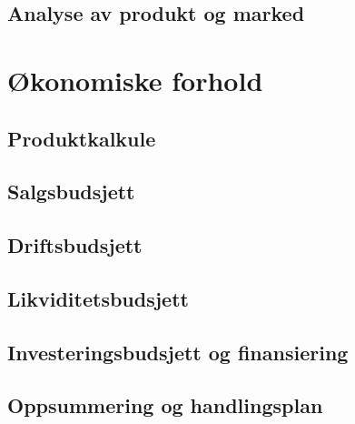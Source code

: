 \subsection{Analyse av produkt og marked}

\section{Økonomiske forhold}

\subsection{Produktkalkule}

\subsection{Salgsbudsjett}

\subsection{Driftsbudsjett}



\subsection{Likviditetsbudsjett}

\subsection{Investeringsbudsjett og finansiering}

\subsection{Oppsummering og handlingsplan}

